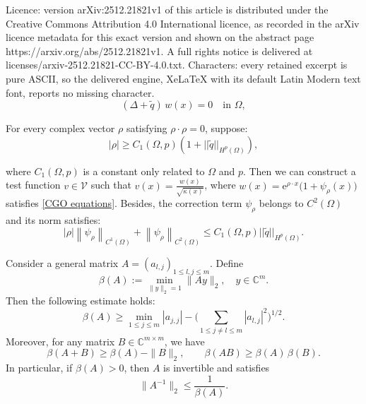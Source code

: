 \documentclass[10pt,a4paper]{amsart}
\begin{document}
Licence: version arXiv:2512.21821v1 of this article is distributed under the Creative Commons Attribution 4.0 International licence, as recorded in the arXiv licence metadata for this exact version and shown on the abstract page https://arxiv.org/abs/2512.21821v1. A full rights notice is delivered at licenses/arxiv-2512.21821-CC-BY-4.0.txt. Characters: every retained excerpt is pure ASCII, so the delivered engine, XeLaTeX with its default Latin Modern text font, reports no missing character.
\begin{equation}\label{CGO equations}
    (\Delta + \tilde{q})\, w(x) = 0 \quad \text{in } \Omega,
\end{equation}

\begin{lem}\label{lemma: test function construction}
For every complex vector $\rho$ satisfying $\rho \cdot \rho=0$, suppose:
\begin{equation}\label{vector condition}
    |\rho|\geq C_1(\Omega,p)(1+||\tilde{q}||_{H^p(\Omega)}),
\end{equation}

where $C_1(\Omega,p)$ is a constant only related to $\Omega$ and $p$. Then we can construct a test function $v\in \mathcal{V}$ such that $v(x)=\frac{w(x)}{\sqrt{\kappa(x)}}$, where $w(x)=\mathrm{e}^{\rho \cdot x}\Big(1+\psi_\rho(x)\Big)$ satisfies \eqref{CGO equations}. Besides, the correction term $\psi_{\rho}$ belongs to $C^{2}(\Omega)$ and its norm satisfies:
\begin{equation}
    |\rho|\left\|\psi_\rho\right\|_{C^{1}(\Omega)}+\left\|\psi_\rho\right\|_{C^{2}(\Omega)} \leqslant C_1(\Omega,p) ||\tilde{q}||_{H^p(\Omega)}.
\end{equation}
\end{lem}

\begin{lem}\label{lowerbound}
    Consider a general matrix $A = (a_{l,j})_{1 \leq l, j \leq m}$. Define
    \[
    \beta(A) := \min_{\|y\|_2 = 1} \|A y\|_2, \quad y \in \mathbb{C}^m.
    \]
    Then the following estimate holds:
    \begin{equation*}
       \beta(A) \geq \min_{1 \leq j \leq m} |a_{j,j}| - \Bigg( \sum_{1 \leq j \neq l \leq m} |a_{l,j}|^2 \Bigg)^{1/2}.
    \end{equation*}
    Moreover, for any matrix $B \in \mathbb{C}^{m \times m}$, we have
    \begin{equation*}
        \beta(A + B) \geq \beta(A) - \|B\|_2, \qquad \beta(AB) \geq \beta(A)\, \beta(B).
    \end{equation*}
    In particular, if $\beta(A) > 0$, then $A$ is invertible and satisfies
    \begin{equation*}
        \|A^{-1}\|_2 \leq \frac{1}{\beta(A)}.
    \end{equation*}
\end{lem}
\end{document}
